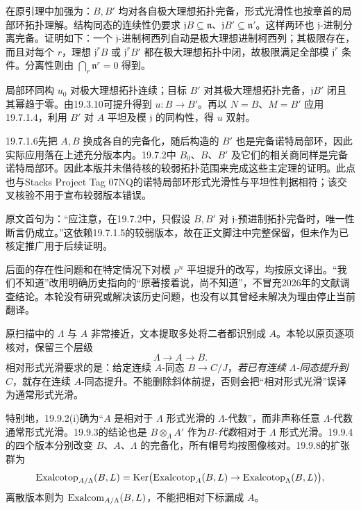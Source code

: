在原引理中加强为：$B,B'$ 均对各自极大理想拓扑完备，形式光滑性也按章首的局部环拓扑理解。结构同态的连续性仍要求 $\mathfrak jB\subseteq\mathfrak n$、$\mathfrak jB'\subseteq\mathfrak n'$。这样两环也 $\mathfrak j$-进制分离完备。证明如下：一个 $\mathfrak j$-进制柯西列自动是极大理想进制柯西列；其极限存在，而且对每个 $r$，理想 $\mathfrak j^rB$ 或 $\mathfrak j^rB'$ 都在极大理想拓扑中闭，故极限满足全部模 $\mathfrak j^r$ 条件。分离性则由 $\bigcap_r\mathfrak n^r=0$ 得到。

局部环同构 $u_0$ 对极大理想拓扑连续；目标 $B'$ 对其极大理想拓扑完备，$\mathfrak jB'$ 闭且其幂趋于零。由19.3.10可提升得到 $u:B\to B'$。再以 $N=B$、$M=B'$ 应用19.7.1.4，利用 $B'$ 对 $A$ 平坦及模 $\mathfrak j$ 的同构性，得 $u$ 双射。

19.7.1.6先把 $A,B$ 换成各自的完备化，随后构造的 $B'$ 也是完备诺特局部环，因此实际应用落在上述充分版本内。19.7.2中 $B_0$、$B$、$B'$ 及它们的相关商同样是完备诺特局部环。因此本版并未借待核的较弱拓扑范围来完成这些主定理的证明。此点也与Stacks Project Tag 07NQ的诺特局部环形式光滑性与平坦性判据相符；该交叉核验不用于宣布较弱版本错误。

原文首句为：“应注意，在19.7.2中，只假设 $B,B'$ 对 $\mathfrak j$-预进制拓扑完备时，唯一性断言仍成立。”这依赖19.7.1.5的较弱版本，故在正文脚注中完整保留，但未作为已核定推广用于后续证明。

后面的存在性问题和在特定情况下对模 $p^n$ 平坦提升的改写，均按原文译出。“我们不知道”改用明确历史指向的“原著接着说，尚不知道”，不冒充2026年的文献调查结论。本轮没有研究或解决该历史问题，也没有以其曾经未解决为理由停止当前翻译。

原扫描中的 $\Lambda$ 与 $A$ 非常接近，文本提取多处将二者都识别成 $A$。本轮以原页逐项核对，保留三个层级
\[
 \Lambda\longrightarrow A\longrightarrow B.
\]
相对形式光滑要求的是：给定连续 $A$-同态 $B\to C/J$，\emph{若已有连续 $\Lambda$-同态提升到 $C$}，就存在连续 $A$-同态提升。不能删除斜体前提，否则会把“相对形式光滑”误译为通常形式光滑。

特别地，19.9.2(i)确为“$A$ 是相对于 $\Lambda$ 形式光滑的 $\Lambda$-代数”，而非声称任意 $\Lambda$-代数通常形式光滑。19.9.3的结论也是 $B\otimes_\Lambda A'$ 作为\emph{$B$-代数}相对于 $\Lambda$ 形式光滑。19.9.4的四个版本分别改变 $B$、$A$、$\Lambda$ 的完备化，所有帽号均按图像核对。19.9.8的扩张群为
\[
 \operatorname{Exalcotop}_{A/\Lambda}(B,L)
 =\operatorname{Ker}\bigl(\operatorname{Exalcotop}_A(B,L)\to\operatorname{Exalcotop}_\Lambda(B,L)\bigr),
\]
离散版本则为 $\operatorname{Exalcom}_{A/\Lambda}(B,L)$，不能把相对下标漏成 $A$。

